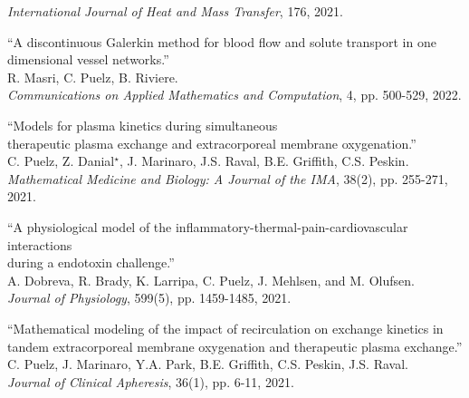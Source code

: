 \documentclass{article} %
\begin{document}
\begin{etaremune}
{\em International Journal of Heat and Mass Transfer}, 176, 2021.
\item ``A discontinuous Galerkin method for blood flow and solute transport in one dimensional vessel networks.'' \\
R. Masri, C. Puelz, B. Riviere. \\
{\em Communications on Applied Mathematics and Computation}, 4, pp. 500-529, 2022.
\item ``Models for plasma kinetics during simultaneous \\therapeutic plasma exchange and extracorporeal membrane oxygenation.'' \\
C. Puelz, Z. Danial$^\star$, J. Marinaro, J.S. Raval, B.E. Griffith, C.S. Peskin. \\ {\em Mathematical Medicine and Biology: A Journal of the IMA}, 38(2), pp. 255-271, 2021. 
\item ``A physiological model of the inflammatory-thermal-pain-cardiovascular interactions \\during a endotoxin challenge.''\\
 A. Dobreva, R. Brady, K. Larripa, C. Puelz, J. Mehlsen, and M. Olufsen. \\
{\em Journal of Physiology}, 599(5), pp. 1459-1485, 2021.
\item ``Mathematical modeling of the impact of recirculation on exchange kinetics in tandem extracorporeal membrane oxygenation and therapeutic plasma exchange.'' \\ 
C. Puelz, J. Marinaro, Y.A. Park, B.E. Griffith, C.S. Peskin, J.S. Raval.\\ 
{\em Journal of Clinical Apheresis}, 36(1), pp. 6-11, 2021.


\end{etaremune}
\end{document}
